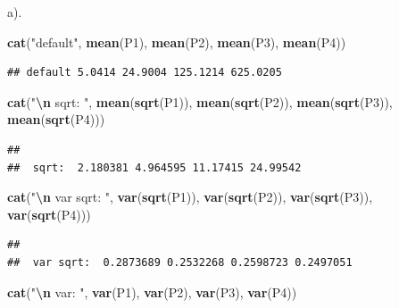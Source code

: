 \documentclass[
]{article}
\newenvironment{Shaded}{\begin{snugshade}}{\end{snugshade}}
\newcommand{\FunctionTok}[1]{\textcolor[rgb]{0.13,0.29,0.53}{\textbf{#1}}}
\newcommand{\NormalTok}[1]{#1}
\newcommand{\SpecialCharTok}[1]{\textcolor[rgb]{0.81,0.36,0.00}{\textbf{#1}}}
\newcommand{\StringTok}[1]{\textcolor[rgb]{0.31,0.60,0.02}{#1}}
\begin{document}
a).

\begin{Shaded}
\begin{Highlighting}[]
\FunctionTok{cat}\NormalTok{(}\StringTok{"default"}\NormalTok{, }\FunctionTok{mean}\NormalTok{(P1), }\FunctionTok{mean}\NormalTok{(P2), }\FunctionTok{mean}\NormalTok{(P3), }\FunctionTok{mean}\NormalTok{(P4))}
\end{Highlighting}
\end{Shaded}

\begin{verbatim}
## default 5.0414 24.9004 125.1214 625.0205
\end{verbatim}

\begin{Shaded}
\begin{Highlighting}[]
\FunctionTok{cat}\NormalTok{(}\StringTok{"}\SpecialCharTok{\textbackslash{}n}\StringTok{ sqrt: "}\NormalTok{, }\FunctionTok{mean}\NormalTok{(}\FunctionTok{sqrt}\NormalTok{(P1)), }\FunctionTok{mean}\NormalTok{(}\FunctionTok{sqrt}\NormalTok{(P2)), }\FunctionTok{mean}\NormalTok{(}\FunctionTok{sqrt}\NormalTok{(P3)), }\FunctionTok{mean}\NormalTok{(}\FunctionTok{sqrt}\NormalTok{(P4)))}
\end{Highlighting}
\end{Shaded}

\begin{verbatim}
## 
##  sqrt:  2.180381 4.964595 11.17415 24.99542
\end{verbatim}

\begin{Shaded}
\begin{Highlighting}[]
\FunctionTok{cat}\NormalTok{(}\StringTok{"}\SpecialCharTok{\textbackslash{}n}\StringTok{ var sqrt: "}\NormalTok{, }\FunctionTok{var}\NormalTok{(}\FunctionTok{sqrt}\NormalTok{(P1)), }\FunctionTok{var}\NormalTok{(}\FunctionTok{sqrt}\NormalTok{(P2)), }\FunctionTok{var}\NormalTok{(}\FunctionTok{sqrt}\NormalTok{(P3)), }\FunctionTok{var}\NormalTok{(}\FunctionTok{sqrt}\NormalTok{(P4)))}
\end{Highlighting}
\end{Shaded}

\begin{verbatim}
## 
##  var sqrt:  0.2873689 0.2532268 0.2598723 0.2497051
\end{verbatim}

\begin{Shaded}
\begin{Highlighting}[]
\FunctionTok{cat}\NormalTok{(}\StringTok{"}\SpecialCharTok{\textbackslash{}n}\StringTok{ var: "}\NormalTok{, }\FunctionTok{var}\NormalTok{(P1), }\FunctionTok{var}\NormalTok{(P2), }\FunctionTok{var}\NormalTok{(P3), }\FunctionTok{var}\NormalTok{(P4))}
\end{Highlighting}
\end{Shaded}
\end{document}
